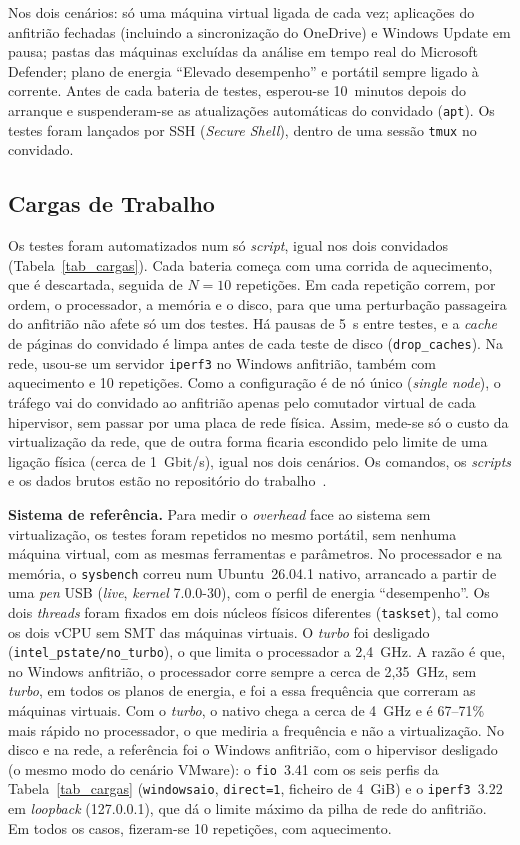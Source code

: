 \documentclass[conference]{IEEEtran}
\begin{document}
Nos dois cenários: só uma máquina virtual ligada de cada vez; aplicações do anfitrião fechadas (incluindo a sincronização do OneDrive) e Windows Update em pausa; pastas das máquinas excluídas da análise em tempo real do Microsoft Defender; plano de energia ``Elevado desempenho'' e portátil sempre ligado à corrente. Antes de cada bateria de testes, esperou-se 10~minutos depois do arranque e suspenderam-se as atualizações automáticas do convidado (\texttt{apt}). Os testes foram lançados por SSH (\textit{Secure Shell}), dentro de uma sessão \texttt{tmux} no convidado.

\subsection{Cargas de Trabalho}
Os testes foram automatizados num só \textit{script}, igual nos dois convidados (Tabela~\ref{tab_cargas}). Cada bateria começa com uma corrida de aquecimento, que é descartada, seguida de $N=10$ repetições. Em cada repetição correm, por ordem, o processador, a memória e o disco, para que uma perturbação passageira do anfitrião não afete só um dos testes. Há pausas de 5~s entre testes, e a \textit{cache} de páginas do convidado é limpa antes de cada teste de disco (\texttt{drop\_caches}). Na rede, usou-se um servidor \texttt{iperf3} no Windows anfitrião, também com aquecimento e 10 repetições. Como a configuração é de nó único (\textit{single node}), o tráfego vai do convidado ao anfitrião apenas pelo comutador virtual de cada hipervisor, sem passar por uma placa de rede física. Assim, mede-se só o custo da virtualização da rede, que de outra forma ficaria escondido pelo limite de uma ligação física (cerca de 1~Gbit/s), igual nos dois cenários. Os comandos, os \textit{scripts} e os dados brutos estão no repositório do trabalho~\cite{b15}.

\textbf{Sistema de referência.} Para medir o \textit{overhead} face ao sistema sem virtualização, os testes foram repetidos no mesmo portátil, sem nenhuma máquina virtual, com as mesmas ferramentas e parâmetros. No processador e na memória, o \texttt{sysbench} correu num Ubuntu~26.04.1 nativo, arrancado a partir de uma \textit{pen} USB (\textit{live}, \textit{kernel} 7.0.0-30), com o perfil de energia ``desempenho''. Os dois \textit{threads} foram fixados em dois núcleos físicos diferentes (\texttt{taskset}), tal como os dois vCPU sem SMT das máquinas virtuais. O \textit{turbo} foi desligado (\texttt{intel\_pstate/no\_turbo}), o que limita o processador a 2,4~GHz. A razão é que, no Windows anfitrião, o processador corre sempre a cerca de 2,35~GHz, sem \textit{turbo}, em todos os planos de energia, e foi a essa frequência que correram as máquinas virtuais. Com o \textit{turbo}, o nativo chega a cerca de 4~GHz e é 67--71\% mais rápido no processador, o que mediria a frequência e não a virtualização. No disco e na rede, a referência foi o Windows anfitrião, com o hipervisor desligado (o mesmo modo do cenário VMware): o \texttt{fio}~3.41 com os seis perfis da Tabela~\ref{tab_cargas} (\texttt{windowsaio}, \texttt{direct=1}, ficheiro de 4~GiB) e o \texttt{iperf3}~3.22 em \textit{loopback} (127.0.0.1), que dá o limite máximo da pilha de rede do anfitrião. Em todos os casos, fizeram-se 10 repetições, com aquecimento.
\end{document}
